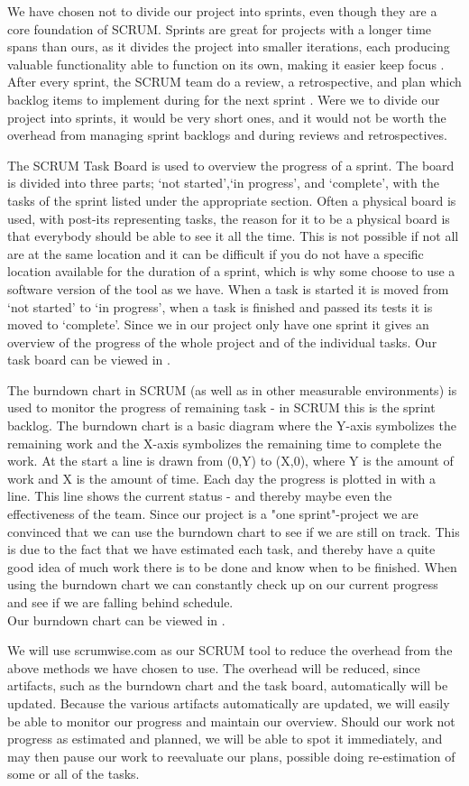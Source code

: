 We have chosen not to divide our project into sprints, even though they are a core foundation of SCRUM.
Sprints are great for projects with a longer time spans than ours, as it divides the project into smaller iterations, each producing valuable functionality able to function on its own, making it easier keep focus \cite[p. ?]{?}.
After every sprint, the SCRUM team do a review, a retrospective, and plan which backlog items to implement during for the next sprint \cite[p. 11]{scrum-org-guide}.
Were we to divide our project into sprints, it would be very short ones, and it would not be worth the overhead from managing sprint backlogs and during reviews and retrospectives.

The SCRUM Task Board is used to overview the progress of a sprint. The board is divided into three parts; `not started',`in progress', and `complete', with the tasks of the sprint listed under the appropriate section. Often a physical board is used, with post-its representing tasks, the reason for it to be a physical board is that everybody should be able to see it all the time. This is not possible if not all are at the same location and it can be difficult if you do not have a specific location available for the duration of a sprint, which is why some choose to use a software version of the tool as we have. When a task is started it is moved from `not started' to `in progress', when a task is finished and passed its tests it is moved to `complete'. Since we in our project only have one sprint it gives an overview of the progress of the whole project and of the individual tasks.
Our task board can be viewed in .

The burndown chart in SCRUM (as well as in other measurable environments) is used to monitor the progress of remaining task - in SCRUM this is the sprint backlog.
The burndown chart is a basic diagram where the Y-axis symbolizes the remaining work and the X-axis symbolizes the remaining time to complete the work.
At the start a line is drawn from (0,Y) to (X,0), where Y is the amount of work and X is the amount of time.
Each day the progress is plotted in with a line. This line shows the current status - and thereby maybe even the effectiveness of the team.
Since our project is a "one sprint"-project we are convinced that we can use the burndown chart to see if we are still on track. This is due to the fact that we have estimated each task, and thereby have a quite good idea of much work there is to be done and know when to be finished. When using the burndown chart we can constantly check up on our current progress and see if we are falling behind schedule.\\
Our burndown chart can be viewed in .

We will use scrumwise.com as our SCRUM tool to reduce the overhead from the above methods we have chosen to use. The overhead will be reduced, since artifacts, such as the burndown chart and the task board, automatically will be updated.
Because the various artifacts automatically are updated, we will easily be able to monitor our progress and maintain our overview. Should our work not progress as estimated and planned, we will be able to spot it immediately, and may then pause our work to reevaluate our plans, possible doing re-estimation of some or all of the tasks.